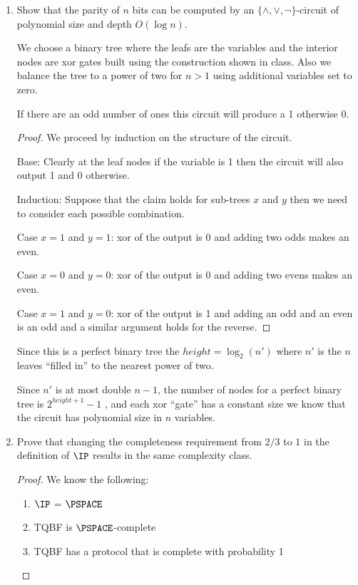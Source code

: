 \documentclass[usletter]{article}
\begin{document}
\begin{enumerate}
 \item Show that the parity of $n$ bits can be computed by an $\{\land, \lor, \neg \}$-circuit of polynomial size and depth $O(\log n)$.

   We choose a binary tree where the leafs are the variables and the interior nodes are xor gates built using the construction shown in class. Also we balance the tree to a power of two for $n > 1$ using additional variables set to zero.

   \begin{claim}
     If there are an odd number of ones this circuit will produce a 1 otherwise 0.
   \end{claim}

   \begin{proof}
     We proceed by induction on the structure of the circuit.

     Base: Clearly at the leaf nodes if the variable is 1 then the circuit will also output 1 and 0 otherwise.

     Induction: Suppose that the claim holds for sub-trees $x$ and $y$ then we need to consider each possible combination.

     Case $x = 1$ and $y = 1$: xor of the output is 0 and adding two odds makes an even.

     Case $x = 0$ and $y = 0$: xor of the output is 0 and adding two evens makes an even.

     Case $x = 1$ and $y = 0$: xor of the output is 1 and adding an odd and an even is an odd and a similar argument holds for the reverse.
   \end{proof}

   Since this is a perfect binary tree the $height = \log_2 (n')$ where $n'$ is the $n$ leaves ``filled in'' to the nearest power of two.

   Since $n'$ is at most double $n-1$, the number of nodes for a perfect binary tree is $2^{height+1}-1$ \cite{wikipedia}, and each xor ``gate'' has a constant size we know that the circuit has polynomial size in $n$ variables.

   \item Prove that changing the completeness requirement from $2/3$ to $1$ in the definition of $\IP$ results in the same complexity class.

     \begin{proof}
      We know the following:

      \begin{enumerate}
        \item $\IP$ = $\PSPACE$ \cite{textbook}
        \item TQBF is $\PSPACE$-complete
        \item TQBF has a protocol that is complete with probability 1
      \end{enumerate}


\end{proof}
\end{enumerate}
\end{document}
